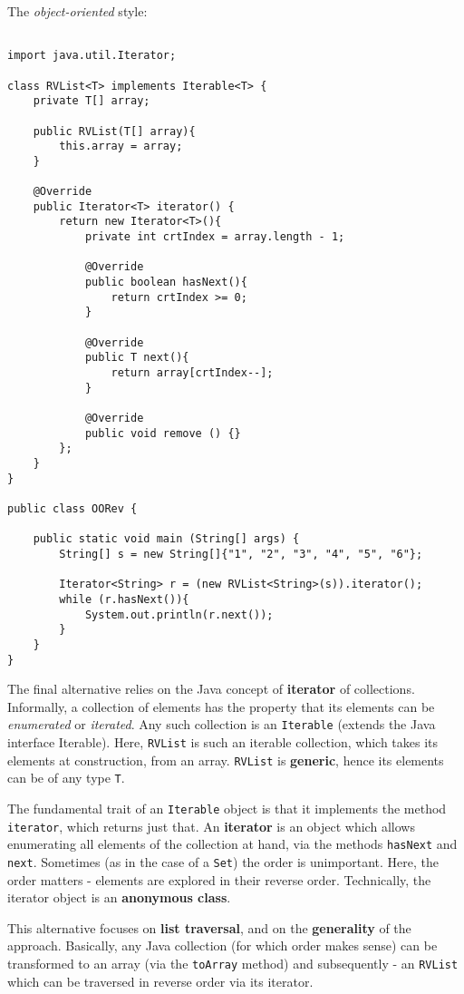 \documentclass[a4paper, 12pt]{article}
\begin{document}
The \textit{object-oriented} style:

\begin{verbatim}

import java.util.Iterator;

class RVList<T> implements Iterable<T> {
	private T[] array;

	public RVList(T[] array){
		this.array = array;
	}

	@Override
	public Iterator<T> iterator() {
		return new Iterator<T>(){
			private int crtIndex = array.length - 1;

			@Override
			public boolean hasNext(){
				return crtIndex >= 0;
			}

			@Override
			public T next(){
				return array[crtIndex--];
			} 

			@Override
			public void remove () {}
		};
	}
}

public class OORev {

	public static void main (String[] args) {
		String[] s = new String[]{"1", "2", "3", "4", "5", "6"};
		
		Iterator<String> r = (new RVList<String>(s)).iterator();
		while (r.hasNext()){
			System.out.println(r.next());
		}
	}
}

\end{verbatim}


The final alternative relies on the Java concept of \textbf{iterator} of collections. Informally, a collection of elements has the property that its elements can be \textit{enumerated} or \textit{iterated}. Any such collection is an \texttt{Iterable} (extends the Java interface Iterable). Here, \texttt{RVList} is such an iterable collection, which takes its elements at construction, from an array. \texttt{RVList} is \textbf{generic}, hence its elements can be of any type \texttt{T}. 

The fundamental trait of an \texttt{Iterable} object is that it implements the method \texttt{iterator}, which returns just that. An \textbf{iterator} is an object which allows enumerating all elements of the collection at hand, via the methods \texttt{hasNext} and \texttt{next}. Sometimes (as in the case of a \texttt{Set}) the order is unimportant. Here, the order matters - elements are explored in their reverse order. Technically, the iterator object is an \textbf{anonymous class}.

This alternative focuses on \textbf{list traversal}, and on the \textbf{generality} of the approach. Basically, any Java collection (for which order makes sense) can be transformed to an array (via the \texttt{toArray} method) and subsequently - an \texttt{RVList} which can be traversed in reverse order via its iterator.
\end{document}
